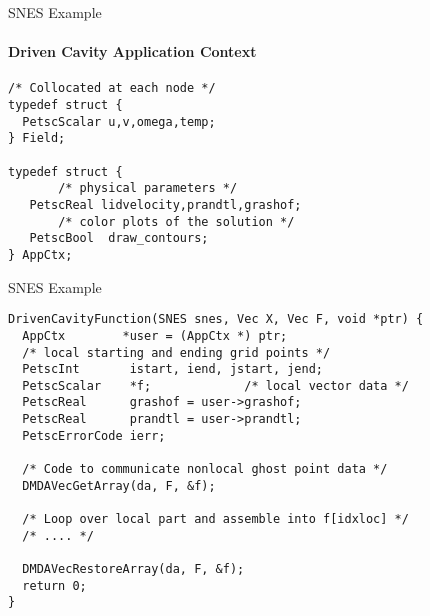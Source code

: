 
\begin{frame}[fragile]{SNES Example}
\framesubtitle{Driven Cavity Application Context}
\begin{verbatim}
/* Collocated at each node */
typedef struct {
  PetscScalar u,v,omega,temp;
} Field;

typedef struct {
       /* physical parameters */
   PetscReal lidvelocity,prandtl,grashof;
       /* color plots of the solution */
   PetscBool  draw_contours;
} AppCtx;
\end{verbatim}
\end{frame}

\begin{frame}[fragile]{SNES Example}
\begin{verbatim}
DrivenCavityFunction(SNES snes, Vec X, Vec F, void *ptr) {
  AppCtx        *user = (AppCtx *) ptr;
  /* local starting and ending grid points */
  PetscInt       istart, iend, jstart, jend;
  PetscScalar    *f;             /* local vector data */
  PetscReal      grashof = user->grashof;  
  PetscReal      prandtl = user->prandtl;
  PetscErrorCode ierr;

  /* Code to communicate nonlocal ghost point data */
  DMDAVecGetArray(da, F, &f);

  /* Loop over local part and assemble into f[idxloc] */
  /* .... */

  DMDAVecRestoreArray(da, F, &f);
  return 0;
}
\end{verbatim}
\end{frame}

